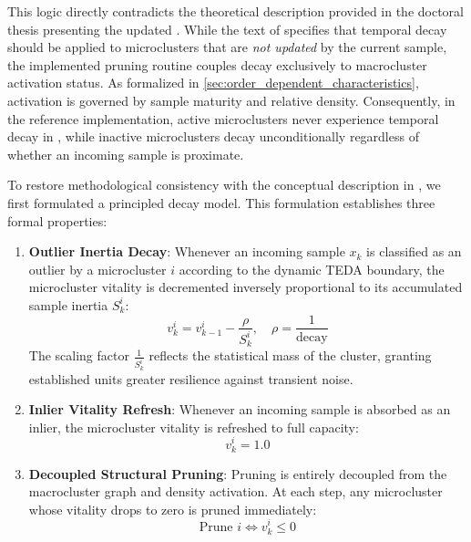 This logic directly contradicts the theoretical description provided in the doctoral thesis presenting the updated \MicroTEDAClus \cite{galindo2021lastmile}. While the text of \cite{galindo2021lastmile} specifies that temporal decay should be applied to microclusters that are \textit{not updated} by the current sample, the implemented pruning routine couples decay exclusively to macrocluster activation status. As formalized in \cref{sec:order_dependent_characteristics}, activation is governed by sample maturity and relative density. Consequently, in the reference implementation, active microclusters never experience temporal decay in , while inactive microclusters decay unconditionally regardless of whether an incoming sample is proximate.

To restore methodological consistency with the conceptual description in \cite{galindo2021lastmile}, we first formulated a principled decay model. This formulation establishes three formal properties:

\begin{enumerate}
    \item \textbf{Outlier Inertia Decay}: Whenever an incoming sample $x_k$ is classified as an outlier by a microcluster $i$ according to the dynamic TEDA boundary, the microcluster vitality is decremented inversely proportional to its accumulated sample inertia $S_k^i$:
    \begin{equation}
        v_k^i = v_{k-1}^i - \frac{\rho}{S_k^i}, \quad \rho = \frac{1}{\text{decay}}
        \label{eq:outlier_inertia_decay}
    \end{equation}
    The scaling factor $\frac{1}{S_k^i}$ reflects the statistical mass of the cluster, granting established units greater resilience against transient noise.
    \item \textbf{Inlier Vitality Refresh}: Whenever an incoming sample is absorbed as an inlier, the microcluster vitality is refreshed to full capacity:
    \begin{equation}
        v_k^i = 1.0
        \label{eq:inlier_vitality_refresh}
    \end{equation}
    \item \textbf{Decoupled Structural Pruning}: Pruning is entirely decoupled from the macrocluster graph and density activation. At each step, any microcluster whose vitality drops to zero is pruned immediately:
    \begin{equation}
        \text{Prune } i \iff v_k^i \le 0
        \label{eq:decoupled_prune_rule}
    \end{equation}
\end{enumerate}

